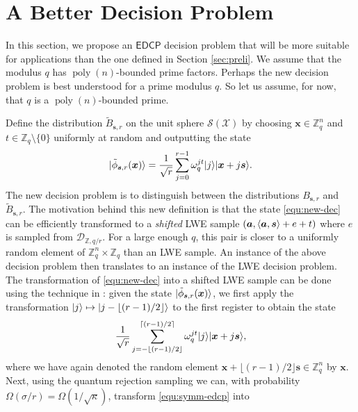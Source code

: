 \documentclass[11pt]{article}
\theoremstyle{plain}
\theoremstyle{definition}
\DeclareMathOperator{\poly}{poly}
\DeclarePairedDelimiter{\ket}{\lvert}{\rangle}
\DeclarePairedDelimiter{\lrang}{\langle}{\rangle}
\def\Z{\ensuremath{\mathbb{Z}}}
\def\edcp{\ensuremath{\mathsf{EDCP}}}
\begin{document}



\section{A Better Decision Problem}

In this section, we propose an $\edcp$ decision problem that will be more suitable for applications than the one defined in Section \ref{sec:preli}. We assume that the modulus $q$ has $\poly(n)$-bounded prime factors. Perhaps the new decision problem is best understood for a prime modulus $q$. So let us assume, for now, that $q$ is a $\poly(n)$-bounded prime. 

Define the distribution $\tilde{B}_{\bm{s}, r}$ on the unit sphere $\mathcal{S(X)}$ by choosing $\bm{x} \in \Z_q^n$ and $t \in \Z_q {\setminus} \{ 0 \}$ uniformly at random and outputting the state
\begin{equation}
    \label{equ:new-dec}
    \ket{\tilde{\phi}_{\bm{s}, r}(\bm{x})} = \frac{1}{\sqrt{r}} \sum_{j = 0}^{r - 1} \omega_q^{jt} \ket{j}\ket{\bm{x} + j\bm{s}}.
\end{equation}
The new decision problem is to distinguish between the distributions $B_{\bm{s}, r}$ and $\tilde{B}_{\bm{s}, r}$. The motivation behind this new definition is that the state \eqref{equ:new-dec} can be efficiently transformed to a \textit{shifted} LWE sample $(\bm{a}, \lrang{\bm{a}, \bm{s}} + e + t)$ where $e$ is sampled from $\mathcal{D}_{\Z, q / r}$. For a large enough $q$, this pair is closer to a uniformly random element of $\Z_q^n \times \Z_q$ than an LWE sample. An instance of the above decision problem then translates to an instance of the LWE decision problem. The transformation of \eqref{equ:new-dec} into a shifted LWE sample can be done using the technique in \cite{brakerski2018learning}: given the state $\ket{\tilde{\phi}_{\bm{s}, r}(\bm{x})}$, we first apply the transformation $\ket{j} \mapsto \ket{j - \lfloor (r - 1) / 2 \rfloor}$ to the first register to obtain the state
\begin{equation}
    \label{equ:symm-edcp}
    \frac{1}{\sqrt{r}} \sum_{j = -\lfloor (r - 1) / 2 \rfloor}^{\lceil (r - 1) / 2 \rceil} \omega_q^{jt} \ket{j}\ket{\bm{x} + j\bm{s}},
\end{equation}
where we have again denoted the random element $\bm{x} + \lfloor (r - 1) / 2 \rfloor \bm{s} \in \Z_q^n$ by $\bm{x}$. Next, using the quantum rejection sampling we can, with probability $\Omega(\sigma / r) = \Omega(1 / \sqrt{\kappa})$, transform \eqref{equ:symm-edcp} into 
\end{document}
